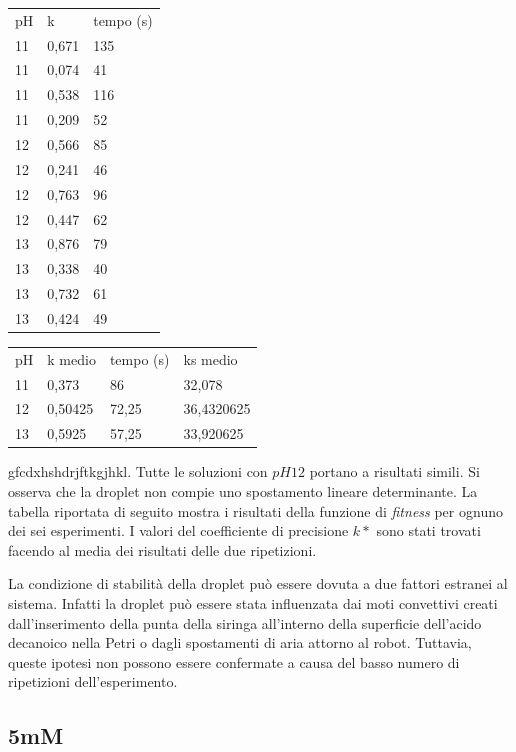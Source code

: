 \begin{center}
\begin{tabular}{lll}
pH & k     & tempo (s) \\
11 & 0,671 & 135       \\
11 & 0,074 & 41        \\
11 & 0,538 & 116       \\
11 & 0,209 & 52        \\
12 & 0,566 & 85        \\
12 & 0,241 & 46        \\
12 & 0,763 & 96        \\
12 & 0,447 & 62        \\
13 & 0,876 & 79        \\
13 & 0,338 & 40        \\
13 & 0,732 & 61        \\
13 & 0,424 & 49       
\end{tabular}
\end{center}


\begin{center}
\begin{tabular}{llll}
pH	& k medio	& tempo (s)	& ks medio\\
11	& 0,373	& 86	& 32,078\\
12	& 0,50425	& 72,25	& 36,4320625\\
13	& 0,5925	& 57,25	& 33,920625
\end{tabular}
\end{center}


gfcdxhshdrjftkgjhkl.
Tutte le soluzioni con $pH12$ portano a risultati simili. Si osserva che la droplet non compie uno spostamento lineare determinante.
La tabella riportata di seguito mostra i risultati della funzione di \emph{fitness} per ognuno dei sei esperimenti. I valori del coefficiente di precisione $k*$ sono stati trovati facendo al media dei risultati delle due ripetizioni.


La condizione di stabilità della droplet può essere dovuta a due fattori estranei al sistema. Infatti la droplet può essere stata influenzata dai moti convettivi creati dall'inserimento della punta della siringa all'interno della superficie dell'acido decanoico nella Petri o dagli spostamenti di aria attorno al robot. Tuttavia, queste ipotesi non possono essere confermate a causa del basso numero di ripetizioni dell'esperimento. 






\subsection{5mM}

